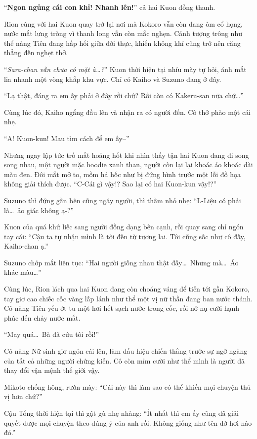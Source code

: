 \documentclass[../main.tex]{subfiles}
\begin{document}
``\textbf{Ngon ngủng cái con khỉ! Nhanh lên!}'' cả hai Kuon đồng thanh.

\ct

Rion cùng với hai Kuon quay trở lại nơi mà Kokoro vẫn còn đang ôm cổ họng, nước mắt lưng tròng vì thanh long vẫn còn mắc nghẹn. Cảnh tượng trông như thể nàng Tiên đang hấp hối giữa đời thực, khiến không khí cũng trở nên căng thẳng đến nghẹt thở.

``\textit{Sara-chan vẫn chưa có mặt à\dots?}'' Kuon thời hiện tại nhíu mày tự hỏi, ánh mắt lia nhanh một vòng khắp khu vực. Chỉ có Kaiho và Suzuno đang ở đây.

``Lạ thật, đáng ra em ấy phải ở đây rồi chứ? Rồi còn có Kakeru-san nữa chứ\dots''

Cùng lúc đó, Kaiho ngẩng đầu lên và nhận ra có người đến. Cô thở phào một cái nhẹ.

``A! Kuon-kun! Mau tìm cách để em ấy--''

Nhưng ngay lập tức trố mắt hoảng hốt khi nhìn thấy tận hai Kuon đang đi song song nhau, một người mặc hoodie xanh than, người còn lại lại khoác áo khoác dài màu đen. Đôi mắt mở to, mồm há hốc như bị đứng hình trước một lỗi đồ họa không giải thích được. ``C-Cái gì vậy!? Sao lại có hai Kuon-kun vậy!?''

Suzuno thì đứng gần bên cũng ngây người, thì thầm nhỏ nhẹ: ``L-Liệu có phải là\dots\ ảo giác không ạ-?''

Kuon của quá khứ liếc sang người đồng dạng bên cạnh, rồi quay sang chỉ ngón tay cái: ``Cậu ta tự nhận mình là tôi đến từ tương lai. Tôi cũng sốc như cô đấy, Kaiho-chan ạ.''

Suzuno chớp mắt liên tục: ``Hai người giống nhau thật đấy\dots\ Nhưng mà\dots\ Áo khác màu\dots''

Cùng lúc, Rion lách qua hai Kuon đang còn choáng váng để tiến tới gần Kokoro, tay giơ cao chiếc cốc vàng lấp lánh như thể một vị nữ thần đang ban nước thánh. Cô nàng Tiên yếu ớt tu một hơi hết sạch nước trong cốc, rồi nở nụ cười hạnh phúc đến chảy nước mắt.

``May quá\dots\ Bà đã cứu tôi rồi!''

Cô nàng Nữ sinh giơ ngón cái lên, làm dấu hiệu chiến thắng trước sự ngỡ ngàng của tất cả những người chứng kiến. Cô còn mỉm cười như thể mình là người đã thay đổi vận mệnh thế giới vậy.

Mikoto chống hông, rướn mày: ``Cái này thì làm sao có thể khiến mọi chuyện thú vị hơn chứ?''

Cậu Tổng thời hiện tại thì gật gù nhẹ nhàng: ``Ít nhất thì em ấy cũng đã giải quyết được mọi chuyện theo đúng ý của anh rồi. Không giống như tên dở hơi nào đó.''
\end{document}
